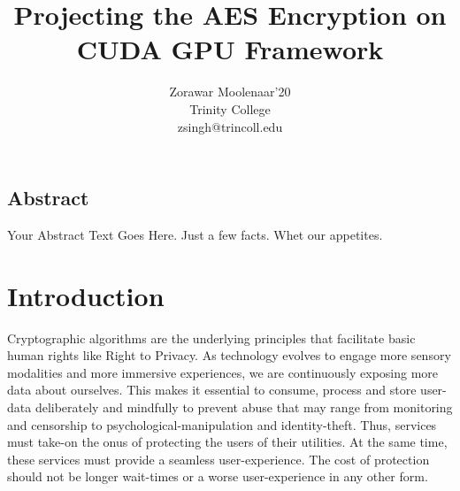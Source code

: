 \documentclass[letterpaper,twocolumn,10pt]{article}
\begin{document}
\date{}

\title{\Large \bf Projecting the AES Encryption on CUDA GPU Framework}

\author{
{\rm Zorawar Moolenaar'20}\\
\rm  Trinity College\\
zsingh@trincoll.edu
}

\maketitle



\subsection*{Abstract}
Your Abstract Text Goes Here.  Just a few facts.
Whet our appetites.

\section{Introduction}



Cryptographic algorithms are the underlying principles that facilitate basic human rights like Right to Privacy.
As technology evolves to engage more sensory modalities and more immersive experiences, we are continuously exposing more data about ourselves.
This makes it essential to consume, process and store user-data deliberately and mindfully to prevent abuse that may range from monitoring and censorship to psychological-manipulation and identity-theft.
Thus, services must take-on the onus of protecting the users of their utilities.
At the same time, these services must provide a seamless user-experience. The cost of protection should not be longer wait-times or a worse user-experience in any other form.
\end{document}
